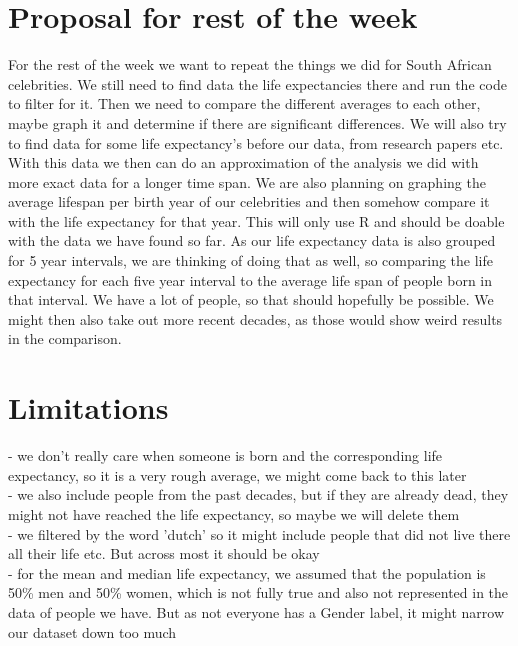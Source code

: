 \documentclass{article}
\begin{document}
\section{Proposal for rest of the week}
For the rest of the week we want to repeat the things we did for South African celebrities. We still need to find data the life expectancies there and run the code to filter for it. Then we need to compare the different averages to each other, maybe graph it and determine if there are significant differences. 
We will also try to find data for some life expectancy's before our data, from research papers etc. With this data we then can do an approximation of the analysis we did with more exact data for a longer time span.
We are also planning on graphing the average lifespan per birth year of our celebrities and then somehow compare it with the life expectancy for that year. This will only use R and should be doable with the data we have found so far. As our life expectancy data is also grouped for 5 year intervals, we are thinking of doing that as well, so comparing the life expectancy for each five year interval to the average life span of people born in that interval. We have a lot of people, so that should hopefully be possible. We might then also take out more recent decades, as those would show weird results in the comparison. 

\section{Limitations}
- we don't really care when someone is born and the corresponding life expectancy, so it is a very rough average, we might come back to this later\\
- we also include people from the past decades, but if they are already dead, they might not have reached the life expectancy, so maybe we will delete them\\
- we filtered by the word 'dutch' so it might include people that did not live there all their life etc. But across most it should be okay\\
- for the mean and median life expectancy, we assumed that the population is 50\% men and 50\% women, which is not fully true and also not represented in the data of people we have. But as not everyone has a Gender label, it might narrow our dataset down too much\\
\end{document}
